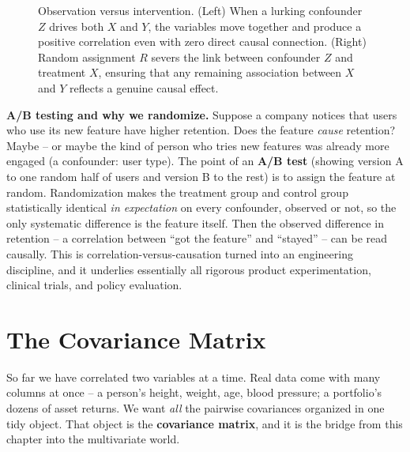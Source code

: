 \begin{figure}[H]
\caption{Observation versus intervention. (Left) When a lurking confounder $Z$ drives both $X$ and $Y$, the variables move together and produce a positive correlation even with zero direct causal connection. (Right) Random assignment $R$ severs the link between confounder $Z$ and treatment $X$, ensuring that any remaining association between $X$ and $Y$ reflects a genuine causal effect.}
\label{ch14:fig-causation}
\end{figure}

\begin{applicationbox}
\textbf{A/B testing and why we randomize.} Suppose a company notices that users who
use its new feature have higher retention. Does the feature \emph{cause} retention?
Maybe -- or maybe the kind of person who tries new features was already more engaged
(a confounder: user type). The point of an \textbf{A/B test} (showing version A to one random half of users and version B to the rest) is to assign the feature at random. Randomization makes the treatment group and control group
statistically identical \emph{in expectation} on every confounder, observed or not,
so the only systematic difference is the feature itself. Then the observed
difference in retention -- a correlation between ``got the feature'' and ``stayed'' --
can be read causally. This is correlation-versus-causation turned into an
engineering discipline, and it underlies essentially all rigorous product
experimentation, clinical trials, and policy evaluation.
\end{applicationbox}

\section{The Covariance Matrix}
\label{ch14:cov-matrix}

So far we have correlated two variables at a time. Real data come with many columns
at once -- a person's height, weight, age, blood pressure; a portfolio's dozens of
asset returns. We want \emph{all} the pairwise covariances organized in one tidy
object. That object is the \textbf{covariance matrix}, and it is the bridge from
this chapter into the multivariate world.


